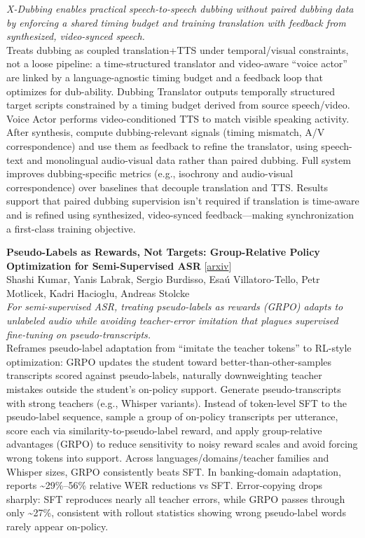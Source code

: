\documentclass[12pt,letterpaper]{article}
\begin{document}
{\small\textit{X-Dubbing enables practical speech-to-speech dubbing without paired dubbing data by enforcing a shared timing budget and training translation with feedback from synthesized, video-synced speech.}}\\[1pt]
{\footnotesize Treats dubbing as coupled translation+TTS under temporal/visual constraints, not a loose pipeline: a time-structured translator and video-aware ``voice actor'' are linked by a language-agnostic timing budget and a feedback loop that optimizes for dub-ability. Dubbing Translator outputs temporally structured target scripts constrained by a timing budget derived from source speech/video. Voice Actor performs video-conditioned TTS to match visible speaking activity. After synthesis, compute dubbing-relevant signals (timing mismatch, A/V correspondence) and use them as feedback to refine the translator, using speech-text and monolingual audio-visual data rather than paired dubbing. Full system improves dubbing-specific metrics (e.g., isochrony and audio-visual correspondence) over baselines that decouple translation and TTS. Results support that paired dubbing supervision isn't required if translation is time-aware and is refined using synthesized, video-synced feedback---making synchronization a first-class training objective.}

\medskip

{\small\textbf{Pseudo-Labels as Rewards, Not Targets: Group-Relative Policy Optimization for Semi-Supervised ASR}} {\scriptsize[\href{https://arxiv.org/abs/2610.32572}{arxiv}]}\\
{\scriptsize Shashi Kumar, Yanis Labrak, Sergio Burdisso, Esa\'u Villatoro-Tello, Petr Motlicek, Kadri Hacioglu, Andreas Stolcke}\\

{\small\textit{For semi-supervised ASR, treating pseudo-labels as rewards (GRPO) adapts to unlabeled audio while avoiding teacher-error imitation that plagues supervised fine-tuning on pseudo-transcripts.}}\\[1pt]
{\footnotesize Reframes pseudo-label adaptation from ``imitate the teacher tokens'' to RL-style optimization: GRPO updates the student toward better-than-other-samples transcripts scored against pseudo-labels, naturally downweighting teacher mistakes outside the student's on-policy support. Generate pseudo-transcripts with strong teachers (e.g., Whisper variants). Instead of token-level SFT to the pseudo-label sequence, sample a group of on-policy transcripts per utterance, score each via similarity-to-pseudo-label reward, and apply group-relative advantages (GRPO) to reduce sensitivity to noisy reward scales and avoid forcing wrong tokens into support. Across languages/domains/teacher families and Whisper sizes, GRPO consistently beats SFT. In banking-domain adaptation, reports \textasciitilde{}29\%--56\% relative WER reductions vs SFT. Error-copying drops sharply: SFT reproduces nearly all teacher errors, while GRPO passes through only \textasciitilde{}27\%, consistent with rollout statistics showing wrong pseudo-label words rarely appear on-policy.}
\end{document}

